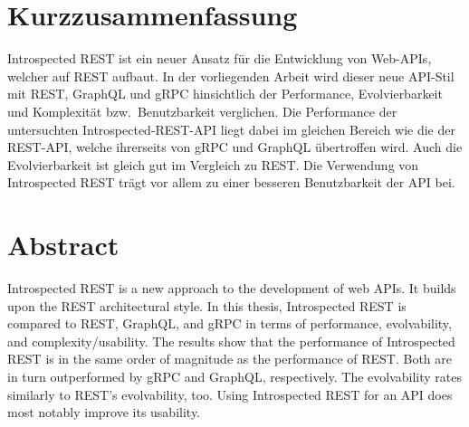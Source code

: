 \thispagestyle{plain}
\chapter*{Kurzzusammenfassung}

Introspected REST ist ein neuer Ansatz für die Entwicklung von Web-APIs, welcher auf REST aufbaut. In der vorliegenden Arbeit wird dieser neue API-Stil mit REST, GraphQL und gRPC hinsichtlich der Performance, Evolvierbarkeit und Komplexität bzw.\ Benutzbarkeit verglichen. Die Performance der untersuchten Introspected-REST-API liegt dabei im gleichen Bereich wie die der REST-API, welche ihrerseits von gRPC und GraphQL übertroffen wird. Auch die Evolvierbarkeit ist gleich gut im Vergleich zu REST. Die Verwendung von Introspected REST trägt vor allem zu einer besseren Benutzbarkeit der API bei.
\bigskip{}

{\let\clearpage\relax\par \chapter*{Abstract}}

Introspected REST is a new approach to the development of web APIs. It builds upon the REST architectural style. In this thesis, Introspected REST is compared to REST, GraphQL, and gRPC in terms of performance, evolvability, and complexity/usability. The results show that the performance of Introspected REST is in the same order of magnitude as the performance of REST\@. Both are in turn outperformed by gRPC and GraphQL, respectively. The evolvability rates similarly to REST's evolvability, too. Using Introspected REST for an API does most notably improve its usability.